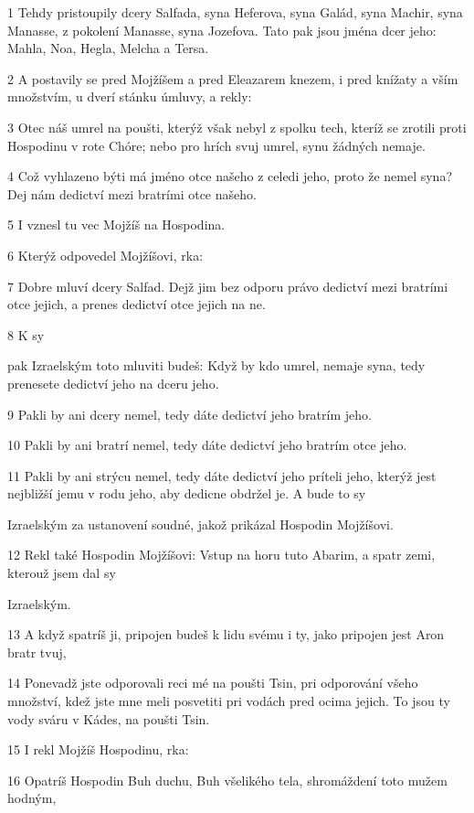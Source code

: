 \par 1 Tehdy pristoupily dcery Salfada, syna Heferova, syna Galád, syna Machir, syna Manasse, z pokolení Manasse, syna Jozefova. Tato pak jsou jména dcer jeho: Mahla, Noa, Hegla, Melcha a Tersa.
\par 2 A postavily se pred Mojžíšem a pred Eleazarem knezem, i pred knížaty a vším množstvím, u dverí stánku úmluvy, a rekly:
\par 3 Otec náš umrel na poušti, kterýž však nebyl z spolku tech, kteríž se zrotili proti Hospodinu v rote Chóre; nebo pro hrích svuj umrel, synu žádných nemaje.
\par 4 Což vyhlazeno býti má jméno otce našeho z celedi jeho, proto že nemel syna? Dej nám dedictví mezi bratrími otce našeho.
\par 5 I vznesl tu vec Mojžíš na Hospodina.
\par 6 Kterýž odpovedel Mojžíšovi, rka:
\par 7 Dobre mluví dcery Salfad. Dejž jim bez odporu právo dedictví mezi bratrími otce jejich, a prenes dedictví otce jejich na ne.
\par 8 K sy\par pak Izraelským toto mluviti budeš: Když by kdo umrel, nemaje syna, tedy prenesete dedictví jeho na dceru jeho.
\par 9 Pakli by ani dcery nemel, tedy dáte dedictví jeho bratrím jeho.
\par 10 Pakli by ani bratrí nemel, tedy dáte dedictví jeho bratrím otce jeho.
\par 11 Pakli by ani strýcu nemel, tedy dáte dedictví jeho príteli jeho, kterýž jest nejbližší jemu v rodu jeho, aby dedicne obdržel je. A bude to sy\par Izraelským za ustanovení soudné, jakož prikázal Hospodin Mojžíšovi.
\par 12 Rekl také Hospodin Mojžíšovi: Vstup na horu tuto Abarim, a spatr zemi, kterouž jsem dal sy\par Izraelským.
\par 13 A když spatríš ji, pripojen budeš k lidu svému i ty, jako pripojen jest Aron bratr tvuj,
\par 14 Ponevadž jste odporovali reci mé na poušti Tsin, pri odporování všeho množství, kdež jste mne meli posvetiti pri vodách pred ocima jejich. To jsou ty vody sváru v Kádes, na poušti Tsin.
\par 15 I rekl Mojžíš Hospodinu, rka:
\par 16 Opatríš Hospodin Buh duchu, Buh všelikého tela, shromáždení toto mužem hodným,
